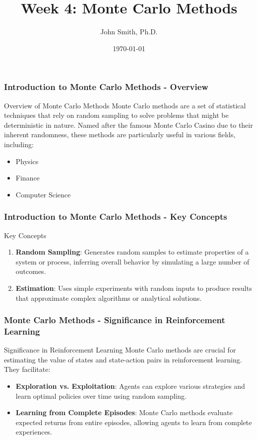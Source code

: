 \documentclass[aspectratio=169]{beamer}
\title[Monte Carlo]{Week 4: Monte Carlo Methods}
\author[J. Smith]{John Smith, Ph.D.}
\date{\today}
\begin{document}
\frame{\titlepage}

\begin{frame}[fragile]
    \frametitle{Introduction to Monte Carlo Methods - Overview}
    \begin{block}{Overview of Monte Carlo Methods}
        Monte Carlo methods are a set of statistical techniques that rely on random sampling to solve problems that might be deterministic in nature. 
        Named after the famous Monte Carlo Casino due to their inherent randomness, these methods are particularly useful in various fields, including:
        \begin{itemize}
            \item Physics
            \item Finance
            \item Computer Science
        \end{itemize}
    \end{block}
\end{frame}

\begin{frame}[fragile]
    \frametitle{Introduction to Monte Carlo Methods - Key Concepts}
    \begin{block}{Key Concepts}
        \begin{enumerate}
            \item \textbf{Random Sampling}: Generates random samples to estimate properties of a system or process, inferring overall behavior by simulating a large number of outcomes.
            \item \textbf{Estimation}: Uses simple experiments with random inputs to produce results that approximate complex algorithms or analytical solutions.
        \end{enumerate}
    \end{block}
\end{frame}

\begin{frame}[fragile]
    \frametitle{Monte Carlo Methods - Significance in Reinforcement Learning}
    \begin{block}{Significance in Reinforcement Learning}
        Monte Carlo methods are crucial for estimating the value of states and state-action pairs in reinforcement learning. They facilitate:
        \begin{itemize}
            \item \textbf{Exploration vs. Exploitation}: Agents can explore various strategies and learn optimal policies over time using random sampling.
            \item \textbf{Learning from Complete Episodes}: Monte Carlo methods evaluate expected returns from entire episodes, allowing agents to learn from complete experiences.
        \end{itemize}
    \end{block}
\end{frame}
\end{document}
